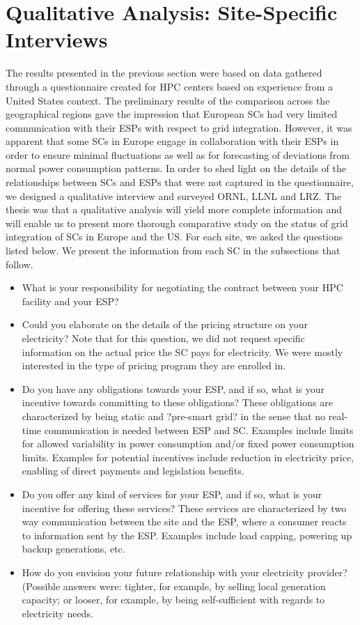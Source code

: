 \section{Qualitative Analysis: Site-Specific Interviews}

The results presented in the previous section were based on data gathered through a questionnaire created for HPC centers based on experience from a United States context. The preliminary results of the comparison across the geographical regions gave the impression that European SCs had very limited communication with their ESPs with respect to grid integration. 
However, it was apparent that some SCs in Europe engage in collaboration with their ESPs in order to ensure minimal fluctuations as well as for forecasting of deviations from normal power consumption patterns. 
In order to shed light on the details of the relationships between SCs and ESPs that were not captured in the questionnaire, we designed a qualitative interview and surveyed ORNL, LLNL and LRZ. The thesis was that a qualitative analysis will yield more complete information and will enable us to present more thorough comparative study on the status of grid integration of SCs in Europe and the US. For each site, we asked the questions listed below. We present the information from each SC in the subsections that follow.

\begin{itemize}
\item {What is your responsibility for negotiating the contract between your HPC facility and your ESP? }
\item {Could you elaborate on the details of the pricing structure on your electricity? Note that for this question, we did not request specific information on the actual price the SC pays for electricity. We were mostly interested in the type of pricing program they are enrolled in.} 
\item {Do you have any obligations towards your ESP, and if so, what is your incentive towards committing to these obligations? These obligations are characterized by being static and ?pre-smart grid? in the sense that no real-time communication is needed between ESP and SC. Examples include limits for allowed variability in power consumption and/or fixed power consumption limits. Examples for potential incentives include reduction in electricity price, enabling of direct payments and legislation benefits. }
\item{Do you offer any kind of services for your ESP, and if so, what is your incentive for offering these services? These services are characterized by two way communication between the site and the ESP, where a consumer reacts to information sent by the ESP. Examples include load capping, powering up backup generations, etc.}
\item{How do you envision your future relationship with your electricity provider? (Possible answers were: tighter, for example, by selling local generation capacity; or looser, for example, by being self-sufficient with regards to electricity needs.}
\end{itemize}


